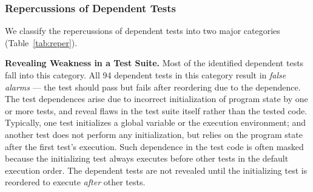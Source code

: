 


\subsubsection{Repercussions of Dependent Tests}
\label{sec:repercussion}



We classify the repercussions of dependent tests
into two major categories (Table~\ref{tab:reper}).

\vspace{1mm}

\noindent \textbf{Revealing Weakness in a Test Suite.} Most of
the identified dependent tests fall into this category.
All 94 dependent tests in this category result in \textit{false alarms}
--- the test should pass but fails after reordering due to the dependence.
The test dependences arise due to incorrect initialization
of program state by one
or more tests, and reveal flaws in the test suite itself
rather than the tested code. Typically, one test initializes
a global variable or the execution environment; and another
test does not perform any initialization, but
relies on the program state after the first test's execution.
Such dependence in the test code is often masked because
the initializing test always executes before other tests in the
default execution order. The dependent tests are not revealed
until the initializing test is reordered to execute
\textit{after} other tests. 


